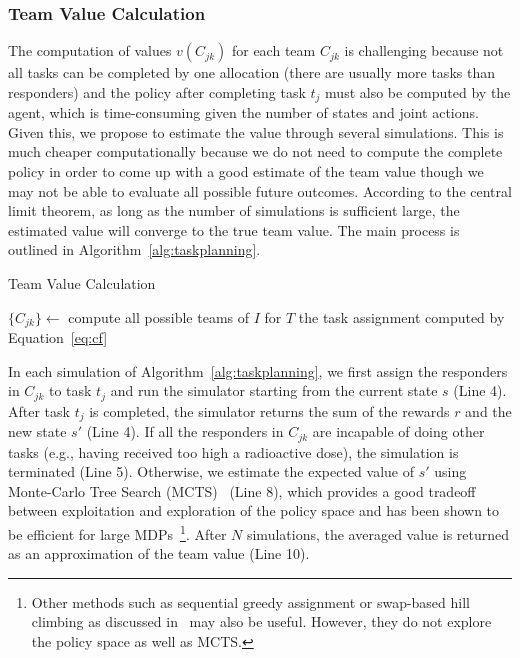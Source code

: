 \subsubsection{Team Value Calculation}
\noindent The computation of values  $v(C_{jk})$ for each team
$C_{jk}$ is challenging because not all tasks can be completed by
one allocation (there are usually more tasks than responders) and
the policy after completing task $t_j$ must also be computed by the
agent, which is time-consuming given the number of states and joint
actions. Given this, we propose to estimate the value through
several simulations. This is much cheaper computationally because
we do not need to compute the complete policy in order to come up
with a good estimate of the team value though we may not be able to
evaluate all possible future outcomes. According to the central
limit theorem, as long as the number of simulations is sufficient
large, the estimated value will converge to the true team value.
The main process is outlined in Algorithm~\ref{alg:taskplanning}.
\begin{algorithm}[htbp]\small
  \caption{Team Value Calculation}
  \label{alg:taskplanning}
  \Indm
  \Indp\BlankLine
  $\{ C_{jk} \} \gets$ compute all possible teams of $I$ for
  $T$ \;
  \Return the task assignment computed by Equation~\ref{eq:cf}
\end{algorithm}

In each simulation of Algorithm~\ref{alg:taskplanning}, we first
assign the responders in $C_{jk}$ to task $t_j$ and run the
simulator starting from the current state $s$ (Line 4). After task
$t_j$ is completed, the simulator returns the sum of the rewards
$r$ and the new state $s'$ (Line 4). If all the responders in
$C_{jk}$ are incapable of doing other tasks (e.g., having received
too high a radioactive dose), the simulation is terminated (Line
5). Otherwise, we estimate the expected value of $s'$ using
Monte-Carlo Tree Search (MCTS)~\cite{kocsis2006bandit} (Line 8),
which provides a good tradeoff between exploitation and exploration
of the policy space and has been shown to be efficient for large
MDPs~\footnote{Other methods such as sequential greedy assignment
or swap-based hill climbing as discussed
in~\cite{proper2009solving} may also be useful. However, they do
not explore the policy space as well as MCTS.}. After $N$
simulations, the averaged value is returned as an approximation of
the team value (Line 10).

